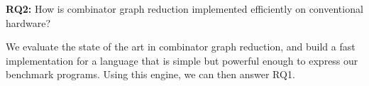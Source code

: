 \documentclass[conference]{IEEEtran}
\begin{document}
\textbf{RQ2:} How is combinator graph reduction implemented efficiently on conventional hardware?

We evaluate the state of the art in combinator graph reduction, and build a fast implementation for a language that is simple but powerful enough to express our benchmark programs.
Using this engine, we can then answer RQ1.




%
%
%
%
\end{document}
